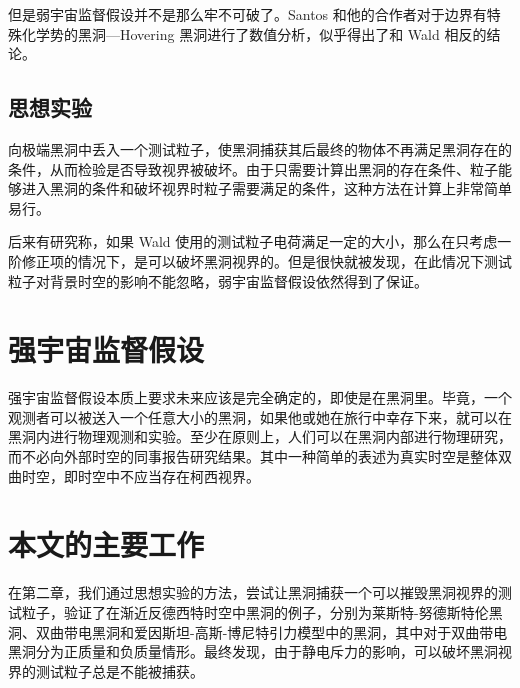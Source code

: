 但是弱宇宙监督假设并不是那么牢不可破了。Santos 和他的合作者对于边界有特殊化学势的黑洞—Hovering 黑洞进行了数值分析\citep{horowitz2015hovering,crisford2017violating}，似乎得出了和 Wald 相反的结论。
\subsection{思想实验}
向极端黑洞中丢入一个测试粒子，使黑洞捕获其后最终的物体不再满足黑洞存在的条件，从而检验是否导致视界被破坏。由于只需要计算出黑洞的存在条件、粒子能够进入黑洞的条件和破坏视界时粒子需要满足的条件，这种方法在计算上非常简单易行。

后来有研究称，如果 Wald 使用的测试粒子电荷满足一定的大小，那么在只考虑一阶修正项的情况下，是可以破坏黑洞视界的\citep{hubeny1999overcharging}。但是很快就被发现，在此情况下测试粒子对背景时空的影响不能忽略\citep{hod2002cosmic,barausse2010test,colleoni2015overspinning,wald2018kerr,sorce2017gedanken}，弱宇宙监督假设依然得到了保证。

\section{强宇宙监督假设}
强宇宙监督假设本质上要求未来应该是完全确定的，即使是在黑洞里。毕竟，一个观测者可以被送入一个任意大小的黑洞，如果他或她在旅行中幸存下来，就可以在黑洞内进行物理观测和实验。至少在原则上，人们可以在黑洞内部进行物理研究，而不必向外部时空的同事报告研究结果\citep{ong2020space}。其中一种简单的表述为真实时空是整体双曲时空，即时空中不应当存在柯西视界。

\section{本文的主要工作}

在第二章，我们通过思想实验的方法，尝试让黑洞捕获一个可以摧毁黑洞视界的测试粒子，验证了在渐近反德西特时空中黑洞的例子，分别为莱斯特-努德斯特伦黑洞、双曲带电黑洞和爱因斯坦-高斯-博尼特引力模型中的黑洞，其中对于双曲带电黑洞分为正质量和负质量情形。最终发现，由于静电斥力的影响，可以破坏黑洞视界的测试粒子总是不能被捕获。